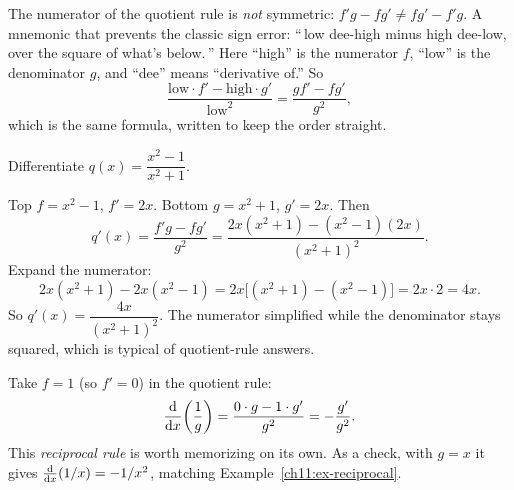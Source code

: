 \begin{trapbox}
The numerator of the quotient rule is \emph{not} symmetric: $f'g - fg' \ne fg' - f'g$. A
mnemonic that prevents the classic sign error: ``\,low dee-high minus high dee-low, over
the square of what's below.\,'' Here ``high'' is the numerator $f$, ``low'' is the
denominator $g$, and ``dee'' means ``derivative of.'' So
\[
  \frac{\text{low}\cdot f' - \text{high}\cdot g'}{\text{low}^2}
  = \frac{g f' - f g'}{g^2},
\]
which is the same formula, written to keep the order straight.
\end{trapbox}

\begin{example}\label{ch11:ex-quot1}
Differentiate $q(x) = \dfrac{x^2 - 1}{x^2 + 1}$.

Top $f = x^2-1$, $f' = 2x$. Bottom $g = x^2+1$, $g' = 2x$. Then
\[
  q'(x) = \frac{f'g - fg'}{g^2}
        = \frac{2x(x^2+1) - (x^2-1)(2x)}{(x^2+1)^2}.
\]
Expand the numerator:
\[
  2x(x^2+1) - 2x(x^2-1) = 2x\big[(x^2+1)-(x^2-1)\big] = 2x\cdot 2 = 4x.
\]
So $q'(x) = \dfrac{4x}{(x^2+1)^2}$. The numerator simplified while the denominator
stays squared, which is typical of quotient-rule answers.
\end{example}

\begin{example}\label{ch11:ex-quot2}
Take $f = 1$ (so $f' = 0$) in the quotient rule:
\[
  \frac{\mathrm{d}}{\mathrm{d} x}\!\left(\frac{1}{g}\right) = \frac{0\cdot g - 1\cdot g'}{g^2} = -\frac{g'}{g^2}.
\]
This \emph{reciprocal rule} is worth memorizing on its own. As a check, with $g=x$ it
gives $\frac{\mathrm{d}}{\mathrm{d} x}\!\left(1/x\right) = -1/x^2$, matching Example~\ref{ch11:ex-reciprocal}.
\end{example}

